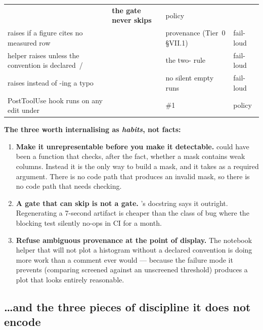 \begin{longtable}{@{}L{4.9cm} L{3.9cm} L{3.9cm} L{2.1cm}@{}}
   & \textbf{the gate never skips} & policy \\
 raises if a figure cites no measured row &
   & provenance (Tier~0 \S VII.1) &
  fail-loud \\
\kap{} helper raises unless the convention is declared
  \,/\, &
   & the two-\kap{} rule &
  fail-loud \\
 raises instead of -ing a typo &
   & no silent empty runs & fail-loud \\
PostToolUse hook runs  on any edit under
   &  & \#1 &
  policy \\
\end{longtable}
\endgroup

\begin{invariant}
\textbf{The three worth internalising as \emph{habits}, not facts:}

\begin{enumerate}
\item \textbf{Make it unrepresentable before you make it detectable.}
   could have been a function that checks, after the fact,
  whether a mask contains weak columns. Instead it is the only way to build a
  mask, and it takes  as a required argument. There is no code
  path that produces an invalid mask, so there is no code path that needs
  checking.
\item \textbf{A gate that can skip is not a gate.} 's
  docstring says it outright. Regenerating a 7-second artifact is cheaper than
  the class of bug where the blocking test silently no-ops in CI for a month.
\item \textbf{Refuse ambiguous provenance at the point of display.} The notebook
  helper that will not plot a \kap{} histogram without a declared convention is
  doing more work than a comment ever would --- because the failure mode it
  prevents (comparing screened \kap{} against an unscreened threshold) produces
  a plot that looks entirely reasonable.
\end{enumerate}
\end{invariant}

\subsection{\ldots and the three pieces of discipline it does not encode}
\label{sec:discipline-intro}

